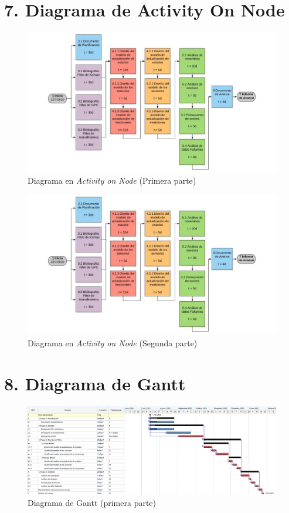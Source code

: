 \documentclass[11pt]{charter}
\begin{document}
\section{7. Diagrama de Activity On Node}
\label{sec:AoN}

\begin{figure}[H]
\centering 
\includegraphics[page=1, width=\textwidth]{./Figuras/AoN.pdf}
\caption{Diagrama en \textit{Activity on Node} (Primera parte)}
\label{fig:AoN}
\end{figure}

\begin{figure}[H]
\centering 
\includegraphics[page=2, width=\textwidth]{./Figuras/AoN.pdf}
\caption{Diagrama en \textit{Activity on Node} (Segunda parte)}
\label{fig:AoN}
\end{figure}


\section{8. Diagrama de Gantt}
\label{sec:gantt}

\begin{figure}[H]
\centering 
\includegraphics[width=1.4\textwidth, angle =90]{./Figuras/Gantt1.pdf}
\caption{Diagrama de Gantt (primera parte)}
\label{fig:Gantt}
\end{figure}
\end{document}
